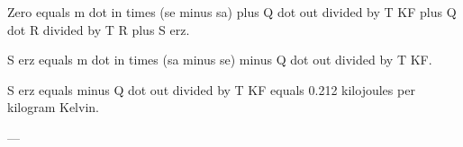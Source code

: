 Zero equals m dot in times (se minus sa) plus Q dot out divided by T KF plus Q dot R divided by T R plus S erz.  

S erz equals m dot in times (sa minus se) minus Q dot out divided by T KF.  

S erz equals minus Q dot out divided by T KF equals 0.212 kilojoules per kilogram Kelvin.  

---